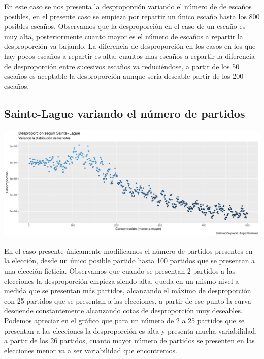 \documentclass[12pt,a4paper,]{book}
\numberwithin{dummy}{section}
\theoremstyle{ocrenumbox}
\theoremstyle{blacknumex}
\theoremstyle{blacknumbox}
\theoremstyle{ocrenum}
\theoremstyle{ocrenum}
\begin{document}
En este caso se nos presenta la desproporción variando el número de de
escaños posibles, en el presente caso se empieza por repartir un único
escaño hasta los 800 posibles escaños. Observamos que la desproporción
en el caso de un escaño es muy alta, posteriormente cuanto mayor es el
número de escaños a repartir la desproporción va bajando. La diferencia
de desproporción en los casos en los que hay pocos escaños a repartir es
alta, cuantos mas escaños a repartir la diferencia de desproporción
entre sucesivos escaños va reduciéndose, a partir de los 50 escaños es
aceptable la desproporción aunque sería deseable partir de los 200
escaños.

\hypertarget{sainte-lague-variando-el-nuxfamero-de-partidos}{%
\subsection{Sainte-Lague variando el número de
partidos}\label{sainte-lague-variando-el-nuxfamero-de-partidos}}

\begin{center}\includegraphics[width=0.95\linewidth]{figurasR/unnamed-chunk-19-1} \end{center}

En el caso presente únicamente modificamos el número de partidos
presentes en la elección, desde un único posible partido hasta 100
partidos que se presentan a una elección ficticia. Observamos que cuando
se presentan 2 partidos a las elecciones la desproporción empieza siendo
alta, queda en un mismo nivel a medida que se presentan más partidos,
alcanzando el máximo de desproporción con 25 partidos que se presentan a
las elecciones, a partir de ese punto la curva desciende constantemente
alcanzando cotas de desproporción muy deseables. Podemos apreciar en el
gráfico que para un número de 2 a 25 partidos que se presentan a las
elecciones la desproporción es alta y presenta mucha variabilidad, a
partir de los 26 partidos, cuanto mayor número de partidos se presenten
en las elecciones menor va a ser variabilidad que encontremos.
\end{document}
